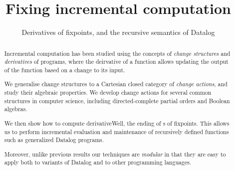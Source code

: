 
%


\usepackage[utf8]{inputenc}
\usepackage{amsmath}
\usepackage{amssymb}
\usepackage{amsthm}
\usepackage{mathtools}
\usepackage{stmaryrd}
\usepackage{thmtools}
\usepackage{todonotes}
\usepackage{etoolbox}
\usepackage{appendix}

\usepackage[
  safeinputenc,
  natbib=true
]{biblatex}
\usepackage{cleveref}
\usepackage{hyperref}

\newcommand{\todoall}[1]{\todo[inline,color=black!30,author=All]{#1}}
\newcommand{\todompj}[1]{\todo[inline,color=yellow!40,author=Michael]{#1}}
\newcommand{\todomario}[1]{\todo[inline,color=blue!40,author=Mario]{#1}}



\newif\ifproofs





%


\begin{abstract}
  Incremental computation has been studied using the concepts of \emph{change
  structures} and \emph{derivatives} of programs, where the deirvative of a function allows updating the output
  of the function based on a change to its input.

  We generalise change structures to a Cartesian closed category of \emph{change actions},
  and study their algebraic properties. We develop change actions for several common structures
  in computer science, including directed-complete partial orders and Boolean algebras.

  We then show how to compute derivativeWell, the ending of s of fixpoints. This allows us to
  perform incremental evaluation and maintenance of recursively defined
  functions such as generalized Datalog programs.

  Moreover, unlike previous results our techniques are \emph{modular} in that
  they are easy to apply both to variants of Datalog and to other programming languages.
\end{abstract}

\title{Fixing incremental computation}
\subtitle{Derivatives of fixpoints, and the recursive semantics of Datalog}

\maketitle

